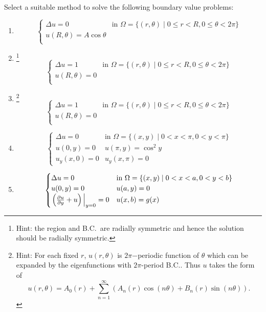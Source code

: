 \begin{question}{4.5}{}
    Select a suitable method to solve the following boundary value problems:
    \begin{enumerate}[label=(\arabic*)]
        \item \[
                \begin{cases}
                    \Delta u=0 & \text{in $\Omega=\{(r,\theta)\mid 0\leq r<R, 0\leq\theta<2\pi\}$} \\
                    u(R,\theta)=A\cos\theta & \\
                \end{cases}
            \]
        \item \footnote{Hint: the region and B.C.\ are radially symmetric and hence the solution should be radially symmetric.}\[
                \begin{cases}
                    \Delta u=1 & \text{in $\Omega=\{(r,\theta)\mid 0\leq r<R, 0\leq\theta<2\pi\}$} \\
                    u(R,\theta)=0 & \\
                \end{cases}
            \]
        \item \footnote{Hint: For each ﬁxed $r$, $u(r, \theta)$ is $2\pi$−periodic function of $\theta$ which can be expanded by the eigenfunctions with $2\pi$-period B.C.. Thus $u$ takes the form of\[u(r,\theta)=A_0(r)+\sum_{n=1}^\infty(A_n(r)\cos(n\theta)+B_n(r)\sin(n\theta)).\]}\[
                \begin{cases}
                    \Delta u=1 & \text{in $\Omega=\{(r,\theta)\mid 0\leq r<R, 0\leq\theta<2\pi\}$} \\
                    u(R,\theta)=0 & \\
                \end{cases}
            \]
        \item \[
                \begin{cases}
                    \Delta u=0 & \text{in $\Omega=\{(x,y)\mid 0<x<\pi, 0<y<\pi\}$} \\
                    u(0,y)=0 & u(\pi,y)=\cos^2y \\
                    u_y(x,0)=0 & u_y(x,\pi)=0
                \end{cases}
            \]
        \item \[
                \begin{cases}
                    \Delta u=0 & \text{in $\Omega=\{(x,y)\mid 0<x<a, 0<y<b\}$} \\
                    u(0,y)=0 & u(a,y)=0 \\
                    \eval{\left(\pdv{u}{y}+u\right)}_{y=0}=0 & u(x,b)=g(x)
                \end{cases}
            \]
    \end{enumerate}
\end{question}
